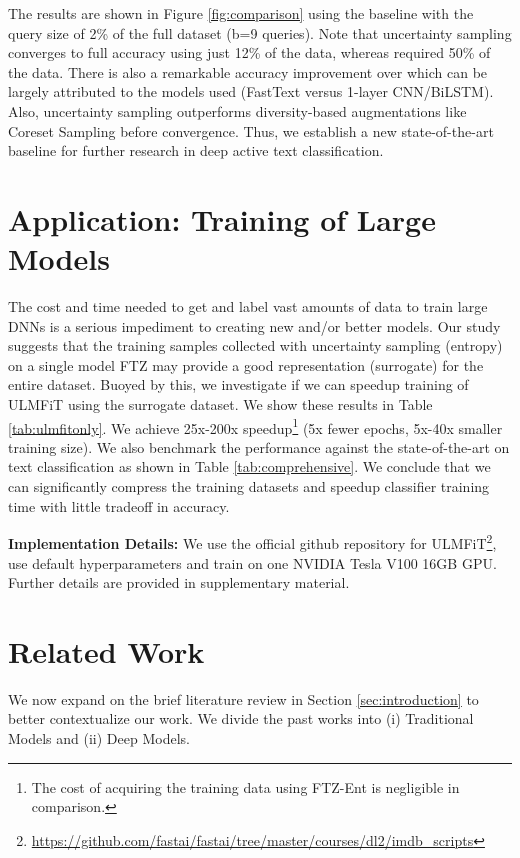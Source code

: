 \documentclass[11pt,a4paper]{article}
\begin{document}
The results are shown in Figure \ref{fig:comparison} using the baseline with the query size of 2\% of the full dataset (b=9 queries). Note that uncertainty sampling converges to full accuracy using just 12\% of the data, whereas \cite{siddhant2018deep} required 50\% of the data. There is also a remarkable accuracy improvement over \cite{siddhant2018deep} which can be largely attributed to the models used (FastText versus 1-layer CNN/BiLSTM). Also, uncertainty sampling outperforms diversity-based augmentations like Coreset Sampling \cite{sener2018active} before convergence. Thus, we establish a new state-of-the-art baseline for further research in deep active text classification.

\section{Application: Training of Large Models}
\label{sec:implications}

The cost and time needed to get and label vast amounts of data to train large DNNs is a serious impediment to creating new and/or better models. Our study suggests that the training samples collected with uncertainty sampling (entropy) on a single model FTZ may provide a good representation (surrogate) for the entire dataset. Buoyed by this, we investigate if we can speedup training of ULMFiT \cite{howard2018universal} using the surrogate dataset. We show these results in Table \ref{tab:ulmfitonly}. We achieve 25x-200x speedup\footnote{The cost of acquiring the training data using FTZ-Ent is negligible in comparison.} (5x fewer epochs, 5x-40x smaller training size). We also benchmark the performance against the state-of-the-art on text classification as shown in Table \ref{tab:comprehensive}. We conclude that we can significantly compress the training datasets and speedup classifier training time with little tradeoff in accuracy.

\textbf{Implementation Details:} We use the official github repository for ULMFiT\footnote{\url{https://github.com/fastai/fastai/tree/master/courses/dl2/imdb\_scripts}}, use default hyperparameters and train on one NVIDIA Tesla V100 16GB GPU. Further details are provided in supplementary material.  \section{Related Work}\label{sec:related}
We now expand on the brief literature review in Section \ref{sec:introduction} to better contextualize our work. We divide the past works into (i) Traditional Models and (ii) Deep Models.
\end{document}
